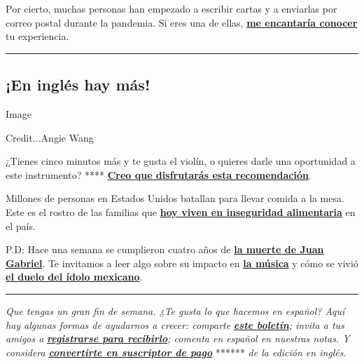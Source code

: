Por cierto, muchas personas han empezado a escribir cartas y a enviarlas
por correo postal durante la pandemia. Si eres una de ellas,
\textbf{\href{mailto:comentarios@NYTimes.com}{me encantaría conocer}} tu
experiencia.

\begin{center}\rule{0.5\linewidth}{\linethickness}\end{center}

\hypertarget{en-ingluxe9s-hay-muxe1s}{%
\subsection{¡En inglés hay más!}\label{en-ingluxe9s-hay-muxe1s}}

Image

Credit...Angie Wang

¿Tienes cinco minutos más y te gusta el violín, o quieres darle una
oportunidad a este instrumento? ****
\textbf{\href{https://www.nytimes3xbfgragh.onion/2020/09/02/arts/music/five-minutes-classical-music-violin.html}{Creo
que disfrutarás esta recomendación}}.

Millones de personas en Estados Unidos batallan para llevar comida a la
mesa. Este es el rostro de las familias que
\textbf{\href{https://www.nytimes3xbfgragh.onion/interactive/2020/09/02/magazine/food-insecurity-hunger-us.html}{hoy
viven en inseguridad alimentaria}} en el país.

P.D: Hace una semana se cumplieron cuatro años de
\textbf{\href{https://www.nytimes3xbfgragh.onion/es/2016/08/29/espanol/america-latina/el-adios-a-juan-gabriel-un-idolo.html}{la
muerte de Juan Gabriel}}. Te invitamos a leer algo sobre su impacto en
\textbf{\href{https://www.nytimes3xbfgragh.onion/es/2016/08/31/espanol/america-latina/juan-gabriel-mexico-musica-conciertos.html}{la
música}} y cómo se vivió
\textbf{\href{https://www.nytimes3xbfgragh.onion/es/2016/08/29/espanol/america-latina/la-muerte-de-juan-gabriel-como-sus-canciones-une-a-mexico.html}{el
duelo del ídolo mexicano}}.

\begin{center}\rule{0.5\linewidth}{\linethickness}\end{center}

\emph{Que tengas un gran fin de semana. ¿Te gusta lo que hacemos en
español? Aquí hay algunas formas de ayudarnos a crecer: comparte}
\textbf{\href{https://www.nytimes3xbfgragh.onion/es/series/el-times}{\emph{este
boletín}}}\emph{; invita a tus amigos a}
\textbf{\href{https://www.nytimes3xbfgragh.onion/newsletters/el-times}{\emph{registrarse
para recibirlo}}}\emph{; comenta en español en nuestras notas. Y
considera}
\textbf{\href{https://www.nytimes3xbfgragh.onion/subscription}{\emph{convertirte
en suscriptor de pago}}} ****** \emph{de la edición en inglés.}

